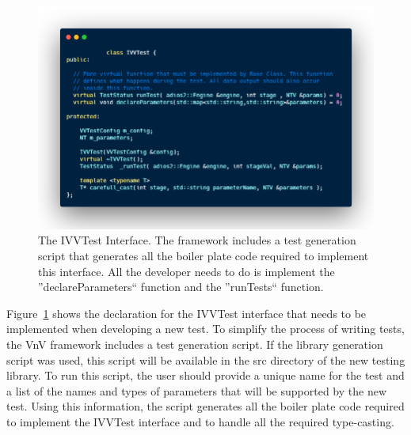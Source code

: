 \begin{figure}
 \includegraphics[width=\textwidth]{./Figures/test-interface.png}
 \caption{The IVVTest Interface. The framework includes a test generation script that generates all the boiler plate code required to implement this interface. All the developer
 needs to do is implement the ''declareParameters`` function and the ''runTests`` function. \label{test-inter}} 
\end{figure}



Figure~\ref{test-inter} shows the declaration for the IVVTest interface that needs to be implemented when developing a new test. To simplify the process of writing tests, the VnV framework includes a test generation script. If the library generation script was used, this script will be available in the src directory of the new testing library. To run this script, the user should provide a unique name for the test and a list of the names and types of parameters that will be supported by the new test. Using this information, the script generates all the boiler plate code required to implement the IVVTest interface and to handle all the required type-casting. 


